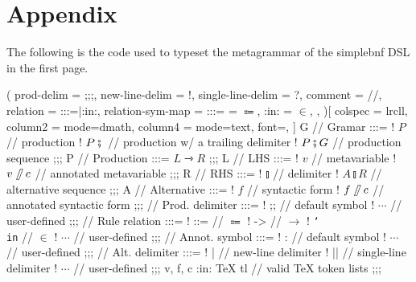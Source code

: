 \documentclass[11pt]{article}
\begin{document}
\section{Appendix}\label{sec:appendix}
The following is the code used to typeset the metagrammar of the \textsf{simplebnf} DSL in the first page.
\begin{listing}[breakable]
\begin{bnf}(
  prod-delim = ;;;,
  new-line-delim = !,
  single-line-delim = ?,
  comment = //,
  relation = {:::=|:in:},
  relation-sym-map =
    {
      {:::=} = $\Coloneqq$,
      {:in:} = $\in$,
    },
)[
  colspec = lrcll,
  column{2} = {mode=dmath},
  column{4} = {mode=text, font=\ttfamily},
]
  G // Gramar :::=
  ! $P$ // production
  ! $P \fatsemi {}$ // production w/ a trailing delimiter
  ! $P \fatsemi G$ // production sequence
;;;
  P // Production :::= $L \rightarrowtriangle R$
;;;
  L // LHS :::=
  ! $v$ // metavariable
  ! $v\!\fatslash\,c$ // annotated metavariable
;;;
  R // RHS :::=
  ! $\talloblong$ // delimiter
  ! $A \talloblong R$ // alternative sequence
;;;
  A // Alternative :::=
  ! $f$ // syntactic form
  ! $f\!\fatslash\,c$ // annotated syntactic form
;;;
  \fatsemi // Prod. delimiter :::=
  ! ;; // default symbol
  ! $\cdots$ // user-defined
;;;
  \rightarrowtriangle // Rule relation :::=
  ! ::= // $\Coloneqq$
  ! -> // $\to$
  ! \texttt{\char`\\in} // $\in$
  ! $\cdots$ // user-defined
;;;
  \fatslash // Annot. symbol :::=
  ! : // default symbol
  ! $\cdots$ // user-defined
;;;
  \talloblong // Alt. delimiter :::=
  ! | // new-line delimiter
  ! || // single-line delimiter
  ! $\cdots$ // user-defined
;;;
  v, f, c :in: \textsf{\TeX{} tl} // valid \TeX{} token lists
;;;
\end{bnf}
\end{listing}
\end{document}

